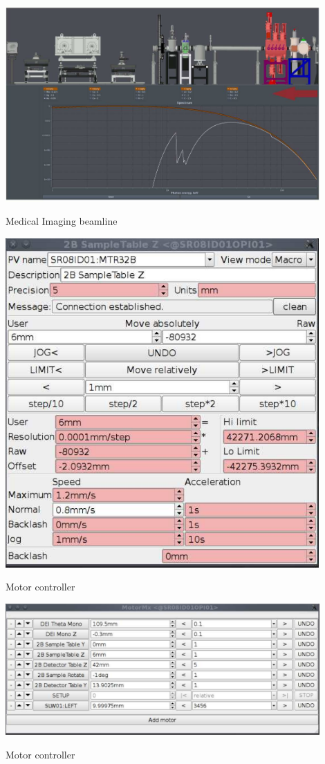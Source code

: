  
\begin{DoxyImage}
\includegraphics[width=12cm]{otherappExample1}
\caption{Medical Imaging beamline}
\end{DoxyImage}
 \par
\par


 
\begin{DoxyImage}
\includegraphics[width=12cm]{otherappExample2}
\caption{Motor controller}
\end{DoxyImage}
 \par
\par


 
\begin{DoxyImage}
\includegraphics[width=12cm]{otherappExample3}
\caption{Motor controller}
\end{DoxyImage}
 